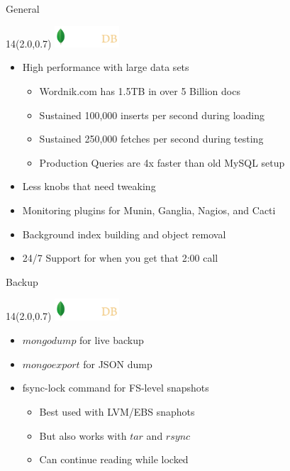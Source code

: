 \documentclass{beamer}
\newcommand{\MongoLogo}{
\begin{textblock}{14}(2.0,0.7)
  \includegraphics[height=0.8cm]{logo-mongodb-ondark.png}
\end{textblock}
}
\begin{document}
\begin{frame}[fragile]{General}
  \MongoLogo
  \begin{itemize}
    \item High performance with large data sets
      \begin{itemize}
        \item Wordnik.com has 1.5TB in over 5 Billion docs
        \item Sustained 100,000 inserts per second during loading
        \item Sustained 250,000 fetches per second during testing
        \item Production Queries are 4x faster than old MySQL setup
      \end{itemize}

    \item Less knobs that need tweaking
    \item Monitoring plugins for Munin, Ganglia, Nagios, and Cacti
    \item Background index building and object removal
    \item 24/7 Support for when you get that 2:00 call

  \end{itemize}
\end{frame}

\begin{frame}[fragile]{Backup}
  \MongoLogo

  \begin{itemize}
    \item $mongodump$ for live backup
    \item $mongoexport$ for JSON dump
    \item fsync-lock command for FS-level snapshots
      \begin{itemize}
        \item Best used with LVM/EBS snaphots
        \item But also works with $tar$ and $rsync$
        \item Can continue reading while locked
      \end{itemize}
  \end{itemize}
\end{frame}
\end{document}
